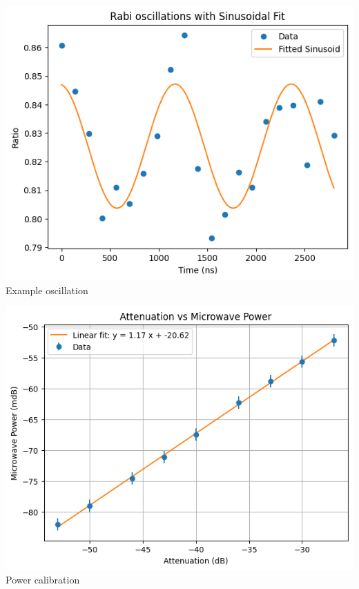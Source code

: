 \documentclass{beamer}
\begin{document}
\begin{frame}{}
    \centering
    \begin{minipage}{0.4\textwidth}
        \centering
        \includegraphics[width=\linewidth]{presentation/figs/oscilations.png} \\
        {\small Example oscillation}
    \end{minipage}
    \hfill
    \begin{minipage}{0.4\textwidth}
        \centering
        \includegraphics[width=\linewidth]{presentation/figs/attenuation_vs_power.png} \\
        {\small Power calibration}
    \end{minipage}


\end{frame}
\end{document}
